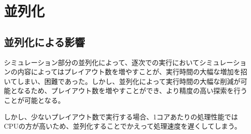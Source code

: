 \documentclass[10pt, a4paper]{jsarticle}
\begin{document}
\section{並列化}
\subsection{並列化による影響}
シミュレーション部分の並列化によって、逐次での実行においてシミュレーションの内容によってはプレイアウト数を増やすことが、実行時間の大幅な増加を招いてしまい、困難であった。しかし、並列化によって実行時間の大幅な削減が可能となるため、プレイアウト数を増やすことができ、より精度の高い探索を行うことが可能となる。
\par しかし、少ないプレイアウト数で実行する場合、1コアあたりの処理性能ではCPUの方が高いため、並列化することでかえって処理速度を遅くしてしまう。
\end{document}
